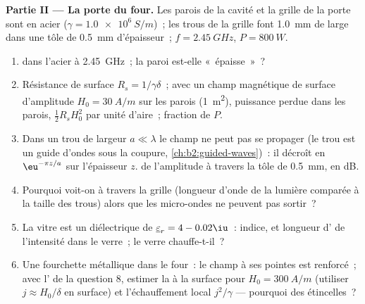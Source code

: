 \begin{problem}
\medskip
\noindent\textbf{Partie II --- La porte du four.}
Les parois de la cavité et la grille de la porte sont en acier ($\gamma = \qty{1.0e6}{S/m}$)~;
les trous de la grille font \qty{1.0}{mm} de large dans une tôle de \qty{0.5}{mm} d'épaisseur~;
$f = \qty{2.45}{GHz}$, $P = \qty{800}{W}$.
\begin{enumerate}[resume]
  \item {} dans l'acier à \qty{2.45}{GHz}~; la paroi est-elle «~épaisse~»~?
  \item Résistance de surface $R_s = 1/\gamma\delta$~; avec un champ magnétique
        de surface d'amplitude $H_0 = \qty{30}{A/m}$ sur les parois (\qty{1}{m^2}),
        puissance perdue dans les parois, $\tfrac12R_sH_0^2$ par unité d'aire~; fraction
        de $P$.
  \item Dans un trou de largeur $a \ll \lambda$ le champ ne peut pas se propager (le
        trou est un guide d'ondes sous la coupure, \cref{ch:b2:guided-waves})~:
        il décroît en $\eu^{-\pi z/a}$ sur l'épaisseur $z$. 
        de l'amplitude à travers la tôle de \qty{0.5}{mm}, en dB.
  \item Pourquoi voit-on à travers la grille (longueur d'onde de la lumière
        comparée à la taille des trous) alors que les micro-ondes ne peuvent pas sortir~?
  \item La vitre est un diélectrique de $\underline\varepsilon_r = 4 - 0.02\iu$~:
        indice, et longueur d' de l'intensité dans le verre~; le
        verre chauffe-t-il~?
  \item Une fourchette métallique dans le four~: le champ à ses pointes est renforcé~;
        avec l' de la question 8, estimer la  à la surface pour $H_0 = \qty{300}{A/m}$ (utiliser $j \approx H_0/\delta$
        en surface) et l'échauffement local $j^2/\gamma$ --- pourquoi des étincelles~?
\end{enumerate}


\end{problem}
